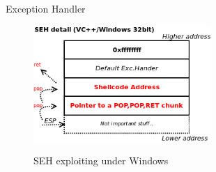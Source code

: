 \begin{frame}{Exception Handler}
\framebreak
	\begin{figure}
        \includegraphics[width=0.6\textwidth]{imgs/seh-exploit.png}
        \label{fig:seh-exploit}
        \caption{SEH exploiting under Windows}
    \end{figure}

\end{frame}

